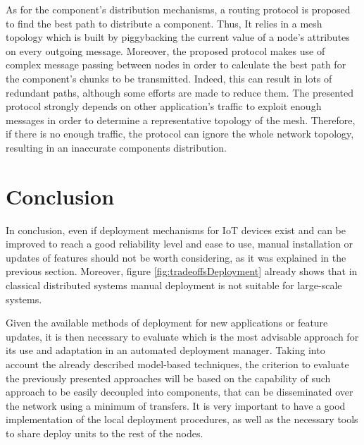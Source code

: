 \begin{description}
	As for the component's distribution mechanisms, a routing protocol is proposed to find the best path to distribute a component.
	Thus, It relies in a mesh topology which is built by piggybacking the current value of a node's attributes on every outgoing message.
	Moreover, the proposed protocol makes use of complex message passing between nodes in order to calculate the best path for the component's chunks to be transmitted.
	Indeed, this can result in lots of redundant paths, although some efforts are made to reduce them.
	The presented protocol strongly depends on other application's traffic to exploit enough messages in order to determine a representative topology of the mesh.
	Therefore, if there is no enough traffic, the protocol can ignore the whole network topology, resulting in an inaccurate components distribution.
\end{description}



\section{Conclusion}
In conclusion, even if deployment mechanisms for IoT devices exist and can be improved to reach a good reliability level and ease to use, manual installation or updates of features should not be worth considering, as it was explained in the previous section.
Moreover, figure \ref{fig:tradeoffsDeployment} already shows that in classical distributed systems manual deployment is not suitable for large-scale systems.

Given the available methods of deployment for new applications or feature updates, it is then necessary to evaluate which is the most advisable approach for its use and adaptation in an automated deployment manager.
Taking into account the already described model-based techniques, the criterion to evaluate the previously presented approaches will be based on the capability of such approach to be easily decoupled into components, that can be disseminated over the network using a minimum of transfers.
It is very important to have a good implementation of the local deployment procedures, as well as the necessary tools to share deploy units to the rest of the nodes.

